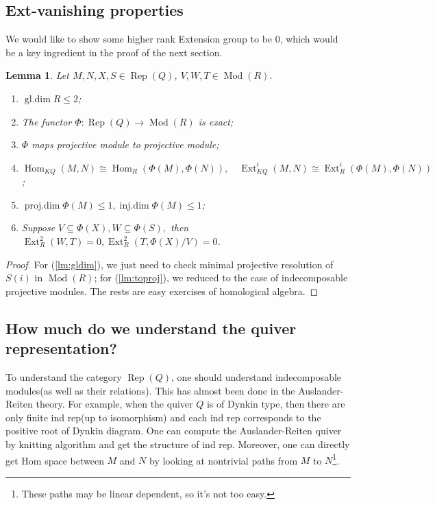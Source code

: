\documentclass[reqno,11pt]{amsart}
\numberwithin{equation}{section}
\theoremstyle{plain}
\newtheorem{lemma}[theorem]{Lemma}
\theoremstyle{plain}
\numberwithin{equation}{section}
\theoremstyle{remark}
\DeclareMathOperator{\Rep}{\operatorname{Rep}}
\DeclareMathOperator{\Mod}{\operatorname{Mod}}
\DeclareMathOperator{\Hom}{\operatorname{Hom}}
\DeclareMathOperator{\Ext}{\operatorname{Ext}}
\DeclareMathOperator{\gldim}{\operatorname{gl.dim}}
\DeclareMathOperator{\projdim}{\operatorname{proj.dim}}
\DeclareMathOperator{\injdim}{\operatorname{inj.dim}}
\begin{document}
\subsection{Ext-vanishing properties}
We would like to show some higher rank Extension group to be 0, which would be a key ingredient in the proof of the next section.

\begin{lemma}\label{lm:Extvan}
Let $M,N,X,S \in \Rep(Q)$, $V,W,T \in \Mod(R)$.
\begin{enumerate}[(1)]
	\item $\gldim R \leqslant 2$;\label{lm:gldim}
	\item The functor $\Phi:\Rep(Q) \longrightarrow \Mod(R)$ is exact;
	\item $\Phi$ maps projective module to projective module;\label{lm:toproj}
	\item $\Hom_{KQ}(M,N) \cong \Hom_{R}(\Phi(M),\Phi(N)),\quad\Ext^i_{KQ}(M,N) \cong \Ext^i_{R}(\Phi(M),\Phi(N))$;
	\item $\projdim \Phi(M) \leqslant 1, \injdim \Phi(M) \leqslant 1$;
	\item Suppose $V \subseteq \Phi(X), W \subseteq \Phi(S),$ then $\Ext^2_{R}(W,T)=0, \Ext^2_{R}(T,\Phi(X)/V)=0$.\label{lm:Ext2van}
\end{enumerate}
\end{lemma}
\begin{proof}
For (\ref{lm:gldim}), we just need to check minimal projective resolution of $S(i)$ in $\Mod(R)$; for (\ref{lm:toproj}), we reduced to the case of indecomposable projective modules. The rests are easy exercises of homological algebra.
\end{proof}
\subsection{How much do we understand the quiver representation?}
To understand the category $\Rep(Q)$, one should understand indecomposable modules(as well as their relations). This has almost been done in the Auslander-Reiten theory. For example, when the quiver $Q$ is of Dynkin type, then there are only finite ind rep(up to isomorphism) and each ind rep corresponds to the positive root of Dynkin diagram. One can compute the Auslander-Reiten quiver by knitting algorithm and get the structure of ind rep. Moreover, one can directly get Hom space between $M$ and $N$ by looking at nontrivial paths from $M$ to $N$\footnote{These paths may be linear dependent, so it's not too easy.}.
\end{document}

